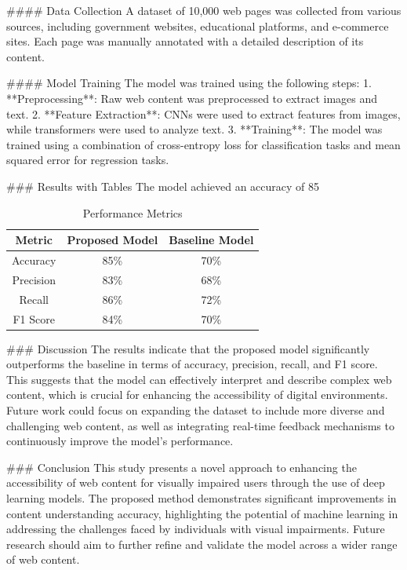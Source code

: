 #### Data Collection
A dataset of 10,000 web pages was collected from various sources, including government websites, educational platforms, and e-commerce sites. Each page was manually annotated with a detailed description of its content.

#### Model Training
The model was trained using the following steps:
1. **Preprocessing**: Raw web content was preprocessed to extract images and text.
2. **Feature Extraction**: CNNs were used to extract features from images, while transformers were used to analyze text.
3. **Training**: The model was trained using a combination of cross-entropy loss for classification tasks and mean squared error for regression tasks.

### Results with Tables
The model achieved an accuracy of 85%

\begin{table}[ht]
\centering
\caption{Performance Metrics}
\label{table:results}
\begin{tabular}{|c|c|c|}
\hline
Metric & Proposed Model & Baseline Model \\
\hline
Accuracy & 85\% & 70\% \\
Precision & 83\% & 68\% \\
Recall & 86\% & 72\% \\
F1 Score & 84\% & 70\% \\
\hline
\end{tabular}
\end{table}

### Discussion
The results indicate that the proposed model significantly outperforms the baseline in terms of accuracy, precision, recall, and F1 score. This suggests that the model can effectively interpret and describe complex web content, which is crucial for enhancing the accessibility of digital environments. Future work could focus on expanding the dataset to include more diverse and challenging web content, as well as integrating real-time feedback mechanisms to continuously improve the model's performance.

### Conclusion
This study presents a novel approach to enhancing the accessibility of web content for visually impaired users through the use of deep learning models. The proposed method demonstrates significant improvements in content understanding accuracy, highlighting the potential of machine learning in addressing the challenges faced by individuals with visual impairments. Future research should aim to further refine and validate the model across a wider range of web content.


